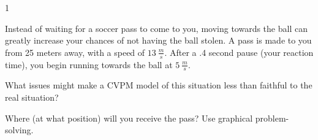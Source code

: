 
\AddToShipoutPicture*{\BackgroundPic}

\addtocounter {ProbNum} {1}

 
{\bf \Large{}} Instead of waiting for a soccer pass to come to you, moving towards the ball can greatly increase your chances of not having the ball stolen.  A pass is made to you from 25 meters away, with a speed of ${13~\tfrac{m}{s}}$.  After a .4 second pause (your reaction time), you begin running towards the ball at ${5~\tfrac{m}{s}}$.

\bigskip
What issues might make a CVPM model of this situation less than faithful to the real situation?

\vspace{30mm}
Where (at what position) will you receive the pass? Use graphical problem-solving.

 
\vfill

\newpage